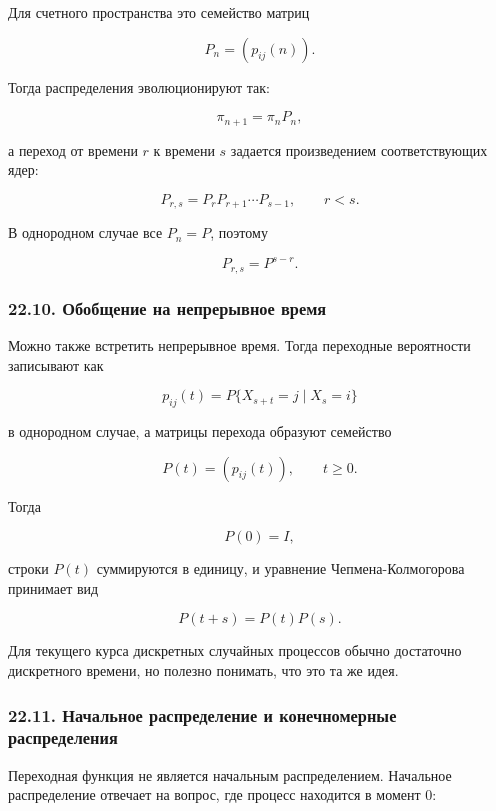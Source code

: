\documentclass[
  11pt,
  a4paper,
]{article}
\begin{document}
Для счетного пространства это семейство матриц

\[
P_n=(p_{ij}(n)).
\]

Тогда распределения эволюционируют так:

\[
\pi_{n+1}=\pi_nP_n,
\]

а переход от времени \(r\) к времени \(s\) задается произведением
соответствующих ядер:

\[
P_{r,s}=P_rP_{r+1}\cdots P_{s-1},
\qquad
r<s.
\]

В однородном случае все \(P_n=P\), поэтому

\[
P_{r,s}=P^{s-r}.
\]

\subsubsection{22.10. Обобщение на непрерывное
время}\label{ux43eux431ux43eux431ux449ux435ux43dux438ux435-ux43dux430-ux43dux435ux43fux440ux435ux440ux44bux432ux43dux43eux435-ux432ux440ux435ux43cux44f}

Можно также встретить непрерывное время. Тогда переходные вероятности
записывают как

\[
p_{ij}(t)=P\{X_{s+t}=j\mid X_s=i\}
\]

в однородном случае, а матрицы перехода образуют семейство

\[
P(t)=(p_{ij}(t)),
\qquad
t\ge0.
\]

Тогда

\[
P(0)=I,
\]

строки \(P(t)\) суммируются в единицу, и уравнение Чепмена-Колмогорова
принимает вид

\[
P(t+s)=P(t)P(s).
\]

Для текущего курса дискретных случайных процессов обычно достаточно
дискретного времени, но полезно понимать, что это та же идея.

\subsubsection{22.11. Начальное распределение и конечномерные
распределения}\label{ux43dux430ux447ux430ux43bux44cux43dux43eux435-ux440ux430ux441ux43fux440ux435ux434ux435ux43bux435ux43dux438ux435-ux438-ux43aux43eux43dux435ux447ux43dux43eux43cux435ux440ux43dux44bux435-ux440ux430ux441ux43fux440ux435ux434ux435ux43bux435ux43dux438ux44f}

Переходная функция не является начальным распределением. Начальное
распределение отвечает на вопрос, где процесс находится в момент \(0\):
\end{document}

